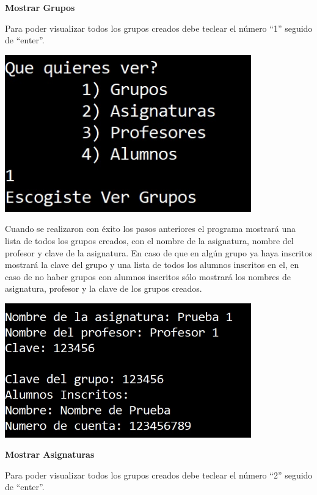 \documentclass[12pt]{report}
\begin{document}
\newpage
\hspace{1cm} \textbf{Mostrar Grupos}

Para poder visualizar todos los grupos creados debe teclear el número ``1'' seguido de ``enter''. 

\begin{center}
    \includegraphics[width=0.8\textwidth]{img/Opcion 6 P2_1.jpg}
\end{center}

Cuando se realizaron con éxito los pasos anteriores el programa mostrará una lista de todos los grupos creados, con el nombre de la asignatura, nombre del profesor y clave de la asignatura. En caso de que en algún grupo ya haya inscritos mostrará la clave del grupo y una lista de todos los alumnos inscritos en el, en caso de no haber grupos con alumnos inscritos sólo mostrará los nombres de asignatura, profesor y la clave de los grupos creados.

\begin{center}
    \includegraphics[width=0.8\textwidth]{img/Opcion 6 P2_1_1.jpg}
\end{center}

\newpage
\hspace{1cm} \textbf{Mostrar Asignaturas}

Para poder visualizar todos los grupos creados debe teclear el número ``2'' seguido de ``enter''. 
\end{document}
